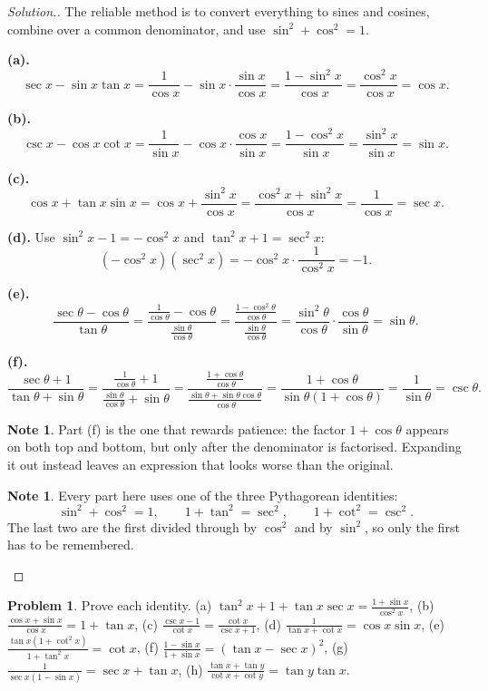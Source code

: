 \documentclass[11pt,a4paper]{article}
\theoremstyle{definition}
\newtheorem{note}[thm]{Note}
\newtheorem{problemx}{Problem}[section]
\newenvironment{problem}{\begin{problemx}}{\end{problemx}}
\newenvironment{solution}
  {\renewcommand{\qedsymbol}{}\begin{proof}[\textit{Solution}.]}
  {\end{proof}}
\begin{document}
\begin{solution}
The reliable method is to convert everything to sines and cosines, combine over a common
denominator, and use $\sin^2+\cos^2=1$.

\textbf{(a).}
$$\sec x-\sin x\tan x=\frac{1}{\cos x}-\sin x\cdot\frac{\sin x}{\cos x}
=\frac{1-\sin^2x}{\cos x}=\frac{\cos^2x}{\cos x}=\cos x.$$

\textbf{(b).}
$$\csc x-\cos x\cot x=\frac{1}{\sin x}-\cos x\cdot\frac{\cos x}{\sin x}
=\frac{1-\cos^2x}{\sin x}=\frac{\sin^2x}{\sin x}=\sin x.$$

\textbf{(c).}
$$\cos x+\tan x\sin x=\cos x+\frac{\sin^2x}{\cos x}=\frac{\cos^2x+\sin^2x}{\cos x}
=\frac{1}{\cos x}=\sec x.$$

\textbf{(d).} Use $\sin^2x-1=-\cos^2x$ and $\tan^2x+1=\sec^2x$:
$$\left(-\cos^2x\right)\left(\sec^2x\right)=-\cos^2x\cdot\frac{1}{\cos^2x}=-1.$$

\textbf{(e).}
$$\frac{\sec\theta-\cos\theta}{\tan\theta}
=\frac{\frac{1}{\cos\theta}-\cos\theta}{\frac{\sin\theta}{\cos\theta}}
=\frac{\frac{1-\cos^2\theta}{\cos\theta}}{\frac{\sin\theta}{\cos\theta}}
=\frac{\sin^2\theta}{\cos\theta}\cdot\frac{\cos\theta}{\sin\theta}=\sin\theta.$$

\textbf{(f).}
$$\frac{\sec\theta+1}{\tan\theta+\sin\theta}
=\frac{\frac{1}{\cos\theta}+1}{\frac{\sin\theta}{\cos\theta}+\sin\theta}
=\frac{\frac{1+\cos\theta}{\cos\theta}}
{\frac{\sin\theta+\sin\theta\cos\theta}{\cos\theta}}
=\frac{1+\cos\theta}{\sin\theta(1+\cos\theta)}=\frac{1}{\sin\theta}=\csc\theta.$$

\begin{note}
Part (f) is the one that rewards patience: the factor $1+\cos\theta$ appears on both top
and bottom, but only after the denominator is factorised. Expanding it out instead leaves
an expression that looks worse than the original.
\end{note}

\begin{note}
Every part here uses one of the three Pythagorean identities:
$$\sin^2+\cos^2=1,\qquad 1+\tan^2=\sec^2,\qquad 1+\cot^2=\csc^2.$$
The last two are the first divided through by $\cos^2$ and by $\sin^2$, so only the
first has to be remembered.
\end{note}
\end{solution}

\begin{problem}
Prove each identity.
\quad (a) $\tan^2x+1+\tan x\sec x=\frac{1+\sin x}{\cos^2x}$, \quad
(b) $\frac{\cos x+\sin x}{\cos x}=1+\tan x$, \quad
(c) $\frac{\csc x-1}{\cot x}=\frac{\cot x}{\csc x+1}$, \quad
(d) $\frac{1}{\tan x+\cot x}=\cos x\sin x$, \quad
(e) $\frac{\tan x\left(1+\cot^2x\right)}{1+\tan^2x}=\cot x$, \quad
(f) $\frac{1-\sin x}{1+\sin x}=(\tan x-\sec x)^2$, \quad
(g) $\frac{1}{\sec x(1-\sin x)}=\sec x+\tan x$, \quad
(h) $\frac{\tan x+\tan y}{\cot x+\cot y}=\tan y\tan x$.
\end{problem}
\end{document}
